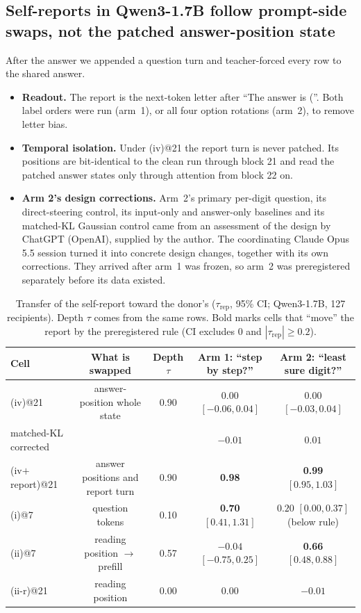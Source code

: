 \documentclass[11pt]{article}
\begin{document}
\subsection{Self-reports in Qwen3-1.7B follow prompt-side swaps, not the patched answer-position state}

After the answer we appended a question turn and teacher-forced every row to the shared answer.
\begin{itemize}
\item \textbf{Readout.} The report is the next-token letter after ``The answer is (''. Both label orders were run (arm~1), or all four option rotations (arm~2), to remove letter bias.
\item \textbf{Temporal isolation.} Under (iv)@21 the report turn is never patched. Its positions are bit-identical to the clean run through block 21 and read the patched answer states only through attention from block 22 on.
\item \textbf{Arm 2's design corrections.} Arm~2's primary per-digit question, its direct-steering control, its input-only and answer-only baselines and its matched-KL Gaussian control came from an assessment of the design by ChatGPT (OpenAI), supplied by the author. The coordinating Claude Opus 5.5 session turned it into concrete design changes, together with its own corrections. They arrived after arm~1 was frozen, so arm~2 was preregistered separately before its data existed.
\end{itemize}

\begin{table}[t]
\centering\small
\caption{Transfer of the self-report toward the donor's ($\tau_\text{rep}$, 95\% CI; Qwen3-1.7B, 127 recipients). Depth $\tau$ comes from the same rows. Bold marks cells that ``move'' the report by the preregistered rule (CI excludes 0 and $|\tau_\text{rep}| \ge 0.2$).}
\label{tab:sr}
\setlength{\tabcolsep}{3pt}\footnotesize
\begin{tabular}{@{}lcccc@{}}
\toprule
Cell & What is swapped & Depth $\tau$ & Arm 1: ``step by step?'' & Arm 2: ``least sure digit?'' \\
\midrule
(iv)@21 & answer-position whole state & 0.90 & $0.00$ $[-0.06, 0.04]$ & $0.00$ $[-0.03, 0.04]$ \\
\quad matched-KL corrected & & & $-0.01$ & $0.01$ \\
(iv$+$report)@21 & answer positions and report turn & 0.90 & \textbf{0.98} & \textbf{0.99} $[0.95, 1.03]$ \\
(i)@7 & question tokens & 0.10 & \textbf{0.70} $[0.41, 1.31]$ & $0.20$ $[0.00, 0.37]$ (below rule) \\
(ii)@7 & reading position $\to$ prefill & 0.57 & $-0.04$ $[-0.75, 0.25]$ & \textbf{0.66} $[0.48, 0.88]$ \\
(ii-r)@21 & reading position & 0.00 & 0.00 & $-0.01$ \\
\bottomrule
\end{tabular}
\end{table}
\end{document}

